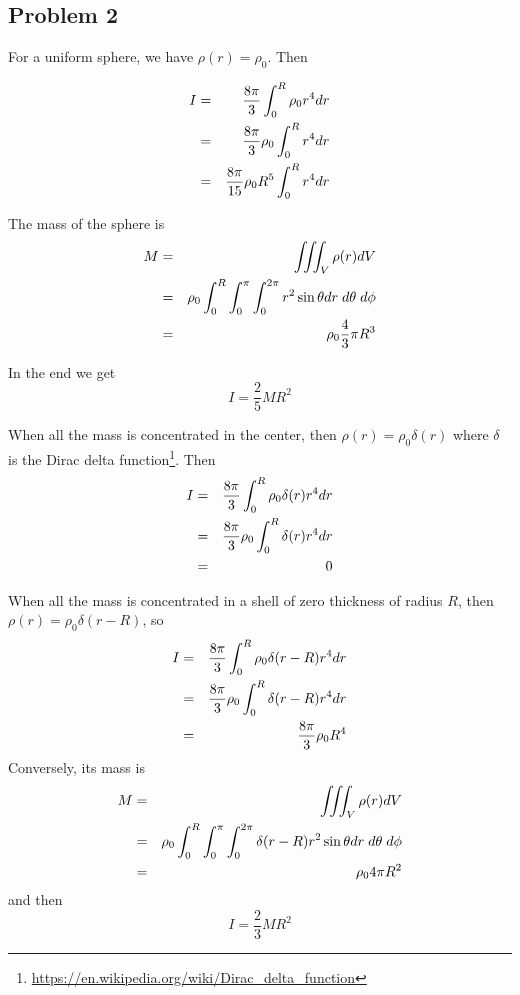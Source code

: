 \newpage
\subsection{Problem 2}

For a uniform sphere, we have $\rho(r)=\rho_0$. Then 

\begin{eqnarray}
I 
&=& \frac{8\pi}{3}  \int_0^R   \rho_0 r^4 dr \nonumber\\
&=& \frac{8\pi}{3}\rho_0  \int_0^R  r^4 dr \nonumber\\
&=& \frac{8\pi}{15}\rho_0 R^5  \int_0^R  r^4 dr \nonumber
\end{eqnarray}

The mass of the sphere is
\begin{eqnarray}
M 
&=& \iiint_V \rho(r) dV \nonumber\\
&=& \rho_0 \int_0^R \int_0^\pi \int_0^{2\pi}   r^2 \sin\theta dr \; d\theta \; d\phi \nonumber\\
&=& \rho_0 \frac{4}{3} \pi R^3
\end{eqnarray}

In the end we get
\[
I = \frac{2}{5} M R^2
\]


When all the mass is concentrated in the center, then $\rho(r)= \rho_0 \delta(r)$ where 
$\delta$ is the Dirac delta function\footnote{\url{https://en.wikipedia.org/wiki/Dirac_delta_function}}.
Then 
\begin{eqnarray}
I 
&=& \frac{8\pi}{3}  \int_0^R   \rho_0 \delta(r) r^4 dr \nonumber\\
&=& \frac{8\pi}{3} \rho_0  \int_0^R  \delta(r) r^4 dr \nonumber\\
&=& 0
\end{eqnarray}

When all the mass is concentrated in a shell of zero thickness of radius $R$, 
then $\rho(r)= \rho_0 \delta(r-R)$, so 
\begin{eqnarray}
I 
&=& \frac{8\pi}{3}  \int_0^R   \rho_0 \delta(r-R) r^4 dr \nonumber\\
&=& \frac{8\pi}{3} \rho_0  \int_0^R  \delta(r-R) r^4 dr \nonumber\\
&=& \frac{8\pi}{3} \rho_0  R^4
\end{eqnarray}
Conversely, its mass is 
\begin{eqnarray}
M 
&=& \iiint_V \rho(r) dV \nonumber\\
&=& \rho_0 \int_0^R \int_0^\pi \int_0^{2\pi} \delta(r-R)  r^2 \sin\theta dr \; d\theta \; d\phi \nonumber\\
&=& \rho_0 4  \pi R^2
\end{eqnarray}
and then 
\[
I = \frac{2}{3} M R^2
\]



